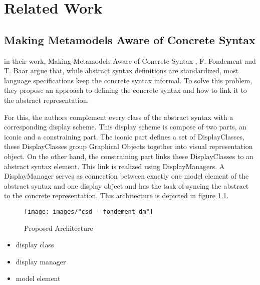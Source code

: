 \chapter{Related Work}
\label{sec:related_work}



\section{Making Metamodels Aware of Concrete Syntax}
\label{sec:fondement}
in their work, Making Metamodels Aware of Concrete Syntax \cite{fondement_making_2005}, F. Fondement and T. Baar argue that, while abstract syntax definitions are standardized, most language specifications keep the concrete syntax informal. To solve this problem, they propose an approach to defining the concrete syntax and how to link it to the abstract representation.

For this, the authors complement every class of the abstract syntax with a corresponding display scheme. This display scheme is compose of two parts, an iconic and a constraining part. The iconic part defines a set of DisplayClasses, these DisplayClasses group Graphical Objects together into visual representation object. On the other hand, the constraining part links these DisplayClasses to an abstract syntax element. This link is realized using DisplayManagers. A DisplayManager serves as connection between exactly one model element of the abstract syntax and one display object and has the task of syncing the abstract to the concrete representation. This architecture is depicted in figure \ref{fig:fondement_dm}.


\begin{figure}[ht]
  \centering
  \texttt{[image: images/"csd - fondement-dm"]}
  \caption{Proposed Architecture }
  \label{fig:fondement_dm}
\end{figure}





\cite{baar_correctly_2008}
\begin{itemize}
  \item display class
  \item display manager
  \item model element
\end{itemize}